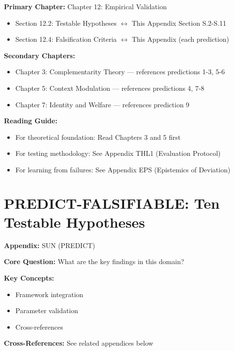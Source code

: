 \begin{tcolorbox}[colback=purple!5!white, colframe=purple!75!black,
    title=Chapter Linkage]

\textbf{Primary Chapter:} Chapter 12: Empirical Validation
\begin{itemize}[nosep]
\item Section 12.2: Testable Hypotheses $\leftrightarrow$ This Appendix Section S.2-S.11
\item Section 12.4: Falsification Criteria $\leftrightarrow$ This Appendix (each prediction)
\end{itemize}

\textbf{Secondary Chapters:}
\begin{itemize}[nosep]
\item Chapter 3: Complementarity Theory --- references predictions 1-3, 5-6
\item Chapter 5: Context Modulation --- references predictions 4, 7-8
\item Chapter 7: Identity and Welfare --- references prediction 9
\end{itemize}

\textbf{Reading Guide:}
\begin{itemize}[nosep]
\item For theoretical foundation: Read Chapters 3 and 5 first
\item For testing methodology: See Appendix THL1 (Evaluation Protocol)
\item For learning from failures: See Appendix EPS (Epistemics of Deviation)
\end{itemize}

\end{tcolorbox}


\chapter{PREDICT-FALSIFIABLE: Ten Testable Hypotheses}
\label{app:S-falsifiable}


\begin{tcolorbox}[colback=blue!5!white, colframe=blue!75!black,
    title=Quick Reference: Appendix SUN]

\textbf{Appendix:} SUN (PREDICT)

\textbf{Core Question:} What are the key findings in this domain?

\textbf{Key Concepts:}
\begin{itemize}[nosep]
\item Framework integration
\item Parameter validation
\item Cross-references
\end{itemize}

\textbf{Cross-References:} See related appendices below
\end{tcolorbox}

